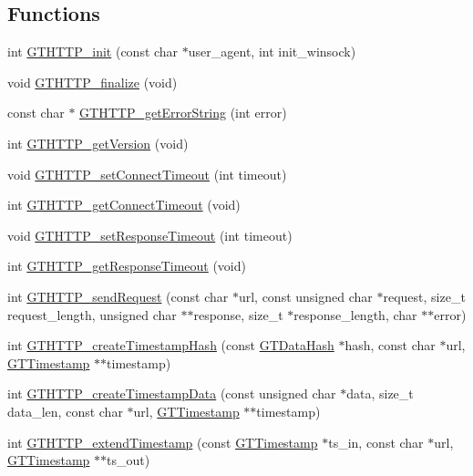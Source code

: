 \subsection*{Functions}
\begin{DoxyCompactItemize}
\item 
int \hyperlink{group__http_gadab3f065f857d5187ab911da1c5c6978}{GTHTTP\_\-init} (const char $\ast$user\_\-agent, int init\_\-winsock)
\item 
void \hyperlink{group__http_gaf4f64a13a6af9a162dfc39c011c2f812}{GTHTTP\_\-finalize} (void)
\item 
const char $\ast$ \hyperlink{group__http_ga3df4ff0f34f540e640e0cc2b7610d921}{GTHTTP\_\-getErrorString} (int error)
\item 
int \hyperlink{group__http_gaf8fed890ccd3245cc91dcf656f969f6f}{GTHTTP\_\-getVersion} (void)
\item 
void \hyperlink{group__http_gae918254645884f0dedd5960980c1c632}{GTHTTP\_\-setConnectTimeout} (int timeout)
\item 
int \hyperlink{group__http_gafc28fbcfb83b8ca6a82053e6bcbcbc04}{GTHTTP\_\-getConnectTimeout} (void)
\item 
void \hyperlink{group__http_ga2144f61afab48c756df3441da928c53e}{GTHTTP\_\-setResponseTimeout} (int timeout)
\item 
int \hyperlink{group__http_ga5265b911e2549b97bf67979fe8026098}{GTHTTP\_\-getResponseTimeout} (void)
\item 
int \hyperlink{group__http_gad6158faeb4747293308cffe102bd9b2d}{GTHTTP\_\-sendRequest} (const char $\ast$url, const unsigned char $\ast$request, size\_\-t request\_\-length, unsigned char $\ast$$\ast$response, size\_\-t $\ast$response\_\-length, char $\ast$$\ast$error)
\item 
int \hyperlink{group__http_ga4e3e8302dd412eed484c83f600006dca}{GTHTTP\_\-createTimestampHash} (const \hyperlink{struct_g_t_message_digest__st}{GTDataHash} $\ast$hash, const char $\ast$url, \hyperlink{group__timestamps_gaddb792efe52216386853c94e7aeaf6ba}{GTTimestamp} $\ast$$\ast$timestamp)
\item 
int \hyperlink{group__http_ga5567c03e03f48709c529dfb323d92a96}{GTHTTP\_\-createTimestampData} (const unsigned char $\ast$data, size\_\-t data\_\-len, const char $\ast$url, \hyperlink{group__timestamps_gaddb792efe52216386853c94e7aeaf6ba}{GTTimestamp} $\ast$$\ast$timestamp)
\item 
int \hyperlink{group__http_gaaad2bfa8db7c4770116197d50fb73b76}{GTHTTP\_\-extendTimestamp} (const \hyperlink{group__timestamps_gaddb792efe52216386853c94e7aeaf6ba}{GTTimestamp} $\ast$ts\_\-in, const char $\ast$url, \hyperlink{group__timestamps_gaddb792efe52216386853c94e7aeaf6ba}{GTTimestamp} $\ast$$\ast$ts\_\-out)
$$
\end{DoxyCompactItemize}
